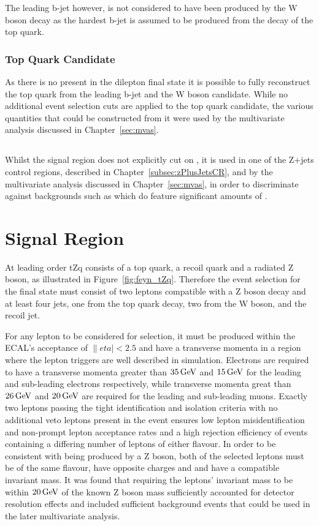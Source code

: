 The leading b-jet however, is not considered to have been produced by the W boson decay as the hardest b-jet is assumed to be produced from the decay of the top quark.

\subsubsection{Top Quark Candidate}
As there is no \MET present in the dilepton final state it is possible to fully reconstruct the top quark from the leading b-jet and the W boson candidate.
While no additional event selection cuts are applied to the top quark candidate, the various quantities that could be constructed from it were used by the multivariate analysis discussed in Chapter~\ref{sec:mvas}.

\subsection{\MET}\label{subsec:met}
Whilst the signal region does not explicitly cut on \MET, it is used in one of the Z+jets control regions, described in Chapter~\ref{subsec:zPlusJetsCR}, and by the multivariate analysis discussed in Chapter~\ref{sec:mvas}, in order to discriminate against backgrounds such as \ttbar which do feature significant amounts of \MET.

\section{Signal Region}\label{sec:signalRegion}
At leading order tZq consists of a top quark, a recoil quark and a radiated Z boson, as illustrated in Figure~\ref{fig:feyn_tZq}.
Therefore the event selection for the final state must consist of two leptons compatible with a Z boson decay and at least four jets, one from the top quark decay, two from the W boson, and the recoil jet.

For any lepton to be considered for selection, it must be produced within the ECAL's acceptance of $\|eta| < 2.5$ and have a transverse momenta in a region where the lepton triggers are well described in simulation.
Electrons are required to have a transverse momenta greater than $35\,\text{Ge\hspace{-.08em}V}$ and $15\,\text{Ge\hspace{-.08em}V}$ for the leading and sub-leading electrons respectively, while transverse momenta great than $26\,\text{Ge\hspace{-.08em}V}$ and $20\,\text{Ge\hspace{-.08em}V}$ are required for the leading and sub-leading muons.
Exactly two leptons passing the tight identification and isolation criteria with no additional veto leptons present in the event ensures low lepton misidentification and non-prompt lepton acceptance rates and a high rejection efficiency of events containing a differing number of leptons of either flavour.
In order to be consistent with being produced by a Z boson, both of the selected leptons must be of the same flavour, have opposite charges and and have a compatible invariant mass.
It was found that requiring the leptons' invariant mass to be within $20\,\text{Ge\hspace{-.08em}V}$ of the known Z boson mass sufficiently accounted for detector resolution effects and included sufficient background events that could be used in the later multivariate analysis.

